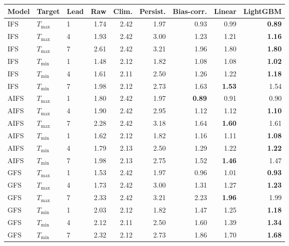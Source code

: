 \begin{tabular}{lllrrrrrr}
\toprule
Model & Target & Lead & Raw & Clim. & Persist. & Bias-corr. & Linear & LightGBM \\
\midrule
IFS & $T_{\max}$ & 1 & 1.74 & 2.42 & 1.97 & 0.93 & 0.99 & \textbf{0.89} \\
IFS & $T_{\max}$ & 4 & 1.93 & 2.42 & 3.00 & 1.23 & 1.21 & \textbf{1.16} \\
IFS & $T_{\max}$ & 7 & 2.61 & 2.42 & 3.21 & 1.96 & 1.80 & \textbf{1.80} \\
IFS & $T_{\min}$ & 1 & 1.48 & 2.12 & 1.82 & 1.08 & 1.08 & \textbf{1.02} \\
IFS & $T_{\min}$ & 4 & 1.61 & 2.11 & 2.50 & 1.26 & 1.22 & \textbf{1.18} \\
IFS & $T_{\min}$ & 7 & 1.98 & 2.12 & 2.73 & 1.63 & \textbf{1.53} & 1.54 \\
\midrule
AIFS & $T_{\max}$ & 1 & 1.80 & 2.42 & 1.97 & \textbf{0.89} & 0.91 & 0.90 \\
AIFS & $T_{\max}$ & 4 & 1.90 & 2.42 & 2.95 & 1.12 & 1.12 & \textbf{1.10} \\
AIFS & $T_{\max}$ & 7 & 2.28 & 2.42 & 3.18 & 1.64 & \textbf{1.60} & 1.61 \\
AIFS & $T_{\min}$ & 1 & 1.62 & 2.12 & 1.82 & 1.16 & 1.11 & \textbf{1.08} \\
AIFS & $T_{\min}$ & 4 & 1.79 & 2.13 & 2.50 & 1.29 & 1.22 & \textbf{1.22} \\
AIFS & $T_{\min}$ & 7 & 1.98 & 2.13 & 2.75 & 1.52 & \textbf{1.46} & 1.47 \\
\midrule
GFS & $T_{\max}$ & 1 & 1.53 & 2.42 & 1.97 & 0.96 & 1.01 & \textbf{0.93} \\
GFS & $T_{\max}$ & 4 & 1.73 & 2.42 & 3.00 & 1.31 & 1.27 & \textbf{1.23} \\
GFS & $T_{\max}$ & 7 & 2.33 & 2.42 & 3.21 & 2.23 & \textbf{1.96} & 1.99 \\
GFS & $T_{\min}$ & 1 & 2.03 & 2.12 & 1.82 & 1.47 & 1.25 & \textbf{1.18} \\
GFS & $T_{\min}$ & 4 & 2.12 & 2.11 & 2.50 & 1.60 & 1.39 & \textbf{1.34} \\
GFS & $T_{\min}$ & 7 & 2.32 & 2.12 & 2.73 & 1.86 & 1.70 & \textbf{1.68} \\
\bottomrule
\end{tabular}